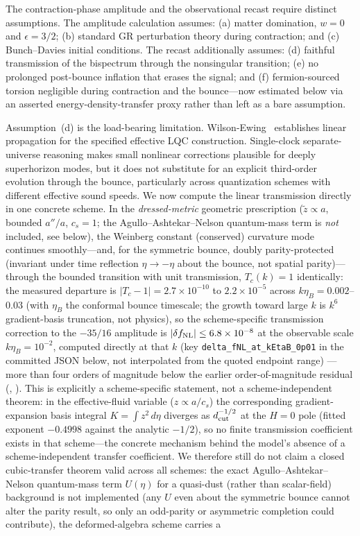 \documentclass[aps,prd,twocolumn,superscriptaddress,showpacs,preprintnumbers,nofootinbib,longbibliography,floatfix]{revtex4-2}
\newcommand{\fnl}{f_{\rm NL}}
\begin{document}
The contraction-phase amplitude and the observational recast require distinct assumptions. The amplitude calculation assumes: (a) matter domination, $w=0$ and $\epsilon=3/2$; (b) standard GR perturbation theory during contraction; and (c) Bunch--Davies initial conditions. The recast additionally assumes: (d) faithful transmission of the bispectrum through the nonsingular transition; (e) no prolonged post-bounce inflation that erases the signal; and (f) fermion-sourced torsion negligible during contraction and the bounce---now estimated below via an asserted energy-density-transfer proxy rather than left as a bare assumption.

Assumption~(d) is the load-bearing limitation. Wilson-Ewing~\cite{WilsonEwing:2012} establishes linear propagation for the specified effective LQC construction. Single-clock separate-universe reasoning makes small nonlinear corrections plausible for deeply superhorizon modes, but it does not substitute for an explicit third-order evolution through the bounce, particularly across quantization schemes with different effective sound speeds. We now compute the linear transmission directly in one concrete scheme. In the \emph{dressed-metric} geometric prescription ($\tilde z\propto a$, bounded $a''/a$, $c_s=1$; the Agullo--Ashtekar--Nelson quantum-mass term is \emph{not} included, see below), the Weinberg constant (conserved) curvature mode continues smoothly---and, for the symmetric bounce, doubly parity-protected (invariant under time reflection $\eta\to-\eta$ about the bounce, not spatial parity)---through the bounded transition with unit transmission, $T_c(k)=1$ identically: the measured departure is $|T_c-1|=2.7\times10^{-10}$ to $2.2\times10^{-5}$ across $k\eta_B=0.002$--$0.03$ (with $\eta_B$ the conformal bounce timescale; the growth toward large $k$ is $k^6$ gradient-basis truncation, not physics), so the scheme-specific transmission correction to the $-35/16$ amplitude is $|\delta\fnl|\le6.8\times10^{-8}$ at the observable scale $k\eta_B=10^{-2}$, computed directly at that $k$ (key \texttt{delta\_fNL\_at\_kEtaB\_0p01} in the committed JSON below, not interpolated from the quoted endpoint range) ---more than four orders of magnitude below the earlier order-of-magnitude residual (, ). This is explicitly a scheme-specific statement, not a scheme-independent theorem: in the effective-fluid variable ($z\propto a/c_s$) the corresponding gradient-expansion basis integral $K=\int z^2\,d\eta$ diverges as $d_{\rm cut}^{-1/2}$ at the $H=0$ pole (fitted exponent $-0.4998$ against the analytic $-1/2$), so no finite transmission coefficient exists in that scheme---the concrete mechanism behind the model's absence of a scheme-independent transfer coefficient. We therefore still do not claim a closed cubic-transfer theorem valid across all schemes: the exact Agullo--Ashtekar--Nelson quantum-mass term $U(\eta)$ for a quasi-dust (rather than scalar-field) background is not implemented (any $U$ even about the symmetric bounce cannot alter the parity result, so only an odd-parity or asymmetric completion could contribute), the deformed-algebra scheme carries a 
\end{document}
